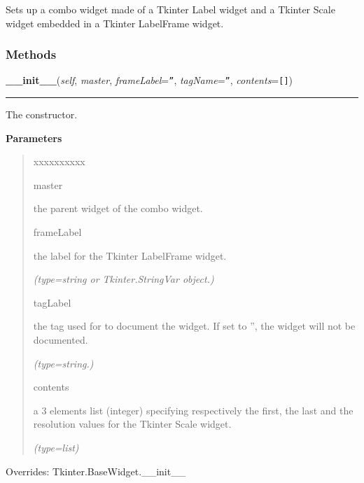 Sets up a combo widget made of a Tkinter Label widget and a Tkinter Scale 
widget embedded in a Tkinter LabelFrame widget.



  \subsubsection{Methods}

    \vspace{0.5ex}

\hspace{.8\funcindent}\begin{boxedminipage}{\funcwidth}

    \raggedright \textbf{\_\_init\_\_}(\textit{self}, \textit{master}, \textit{frameLabel}={\tt ''}, \textit{tagName}={\tt ''}, \textit{contents}={\tt []})

    \vspace{-1.5ex}

    \rule{\textwidth}{0.5\fboxrule}
\setlength{\parskip}{2ex}
    The constructor.

\setlength{\parskip}{1ex}
      \textbf{Parameters}
      \vspace{-1ex}

      \begin{quote}
        \begin{Ventry}{xxxxxxxxxx}

          \item[master]

          the parent widget of the combo widget.

          \item[frameLabel]

          the label for the Tkinter LabelFrame widget.

            {\it (type=string or Tkinter.StringVar object.)}

          \item[tagLabel]

          the tag used for to document the widget. If set to '', the widget
          will not be documented.

            {\it (type=string.)}

          \item[contents]

          a 3 elements list (integer) specifying respectively the first, 
          the last and the resolution values for the Tkinter Scale widget.

            {\it (type=list)}

        \end{Ventry}

      \end{quote}

      Overrides: Tkinter.BaseWidget.\_\_init\_\_

    \end{boxedminipage}

